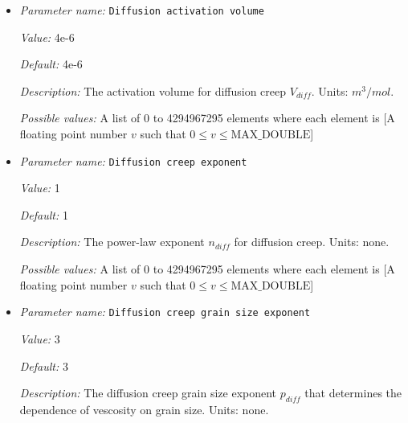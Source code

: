 \begin{itemize}
{\it Possible values:} A list of 0 to 4294967295 elements where each element is [A floating point number $v$ such that $0 \leq v \leq \text{MAX\_DOUBLE}$]
\item {\it Parameter name:} {\tt Diffusion activation volume}
\label{parameters:Material model/Grain size model/Diffusion activation volume}
\label{parameters:Material_20model/Grain_20size_20model/Diffusion_20activation_20volume}


{\it Value:} 4e-6


{\it Default:} 4e-6


{\it Description:} The activation volume for diffusion creep $V_{diff}$. Units: $m^3/mol$.


{\it Possible values:} A list of 0 to 4294967295 elements where each element is [A floating point number $v$ such that $0 \leq v \leq \text{MAX\_DOUBLE}$]
\item {\it Parameter name:} {\tt Diffusion creep exponent}
\label{parameters:Material model/Grain size model/Diffusion creep exponent}
\label{parameters:Material_20model/Grain_20size_20model/Diffusion_20creep_20exponent}


{\it Value:} 1


{\it Default:} 1


{\it Description:} The power-law exponent $n_{diff}$ for diffusion creep. Units: none.


{\it Possible values:} A list of 0 to 4294967295 elements where each element is [A floating point number $v$ such that $0 \leq v \leq \text{MAX\_DOUBLE}$]
\item {\it Parameter name:} {\tt Diffusion creep grain size exponent}
\label{parameters:Material model/Grain size model/Diffusion creep grain size exponent}
\label{parameters:Material_20model/Grain_20size_20model/Diffusion_20creep_20grain_20size_20exponent}


{\it Value:} 3


{\it Default:} 3


{\it Description:} The diffusion creep grain size exponent $p_{diff}$ that determines the dependence of vescosity on grain size. Units: none.



\end{itemize}
